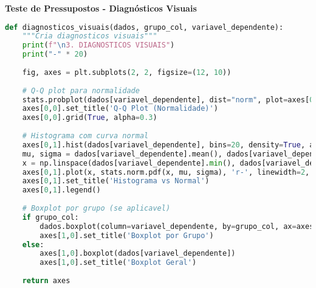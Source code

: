 \begin{examplebox}
\textbf{Teste de Pressupostos - Diagnósticos Visuais}

\begin{lstlisting}[language=Python]
def diagnosticos_visuais(dados, grupo_col, variavel_dependente):
    """Cria diagnosticos visuais"""
    print(f"\n3. DIAGNOSTICOS VISUAIS")
    print("-" * 20)
    
    fig, axes = plt.subplots(2, 2, figsize=(12, 10))
    
    # Q-Q plot para normalidade
    stats.probplot(dados[variavel_dependente], dist="norm", plot=axes[0,0])
    axes[0,0].set_title('Q-Q Plot (Normalidade)')
    axes[0,0].grid(True, alpha=0.3)
    
    # Histograma com curva normal
    axes[0,1].hist(dados[variavel_dependente], bins=20, density=True, alpha=0.7)
    mu, sigma = dados[variavel_dependente].mean(), dados[variavel_dependente].std()
    x = np.linspace(dados[variavel_dependente].min(), dados[variavel_dependente].max(), 100)
    axes[0,1].plot(x, stats.norm.pdf(x, mu, sigma), 'r-', linewidth=2, label='Normal teorica')
    axes[0,1].set_title('Histograma vs Normal')
    axes[0,1].legend()
    
    # Boxplot por grupo (se aplicavel)
    if grupo_col:
        dados.boxplot(column=variavel_dependente, by=grupo_col, ax=axes[1,0])
        axes[1,0].set_title('Boxplot por Grupo')
    else:
        axes[1,0].boxplot(dados[variavel_dependente])
        axes[1,0].set_title('Boxplot Geral')
    
    return axes
\end{lstlisting}
\end{examplebox}

